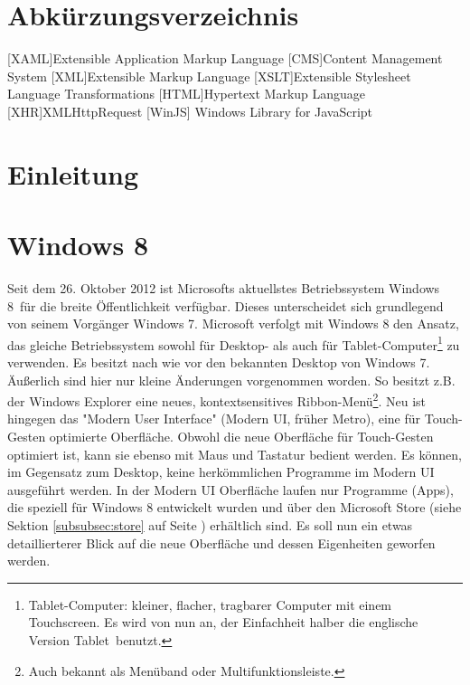 \documentclass[12pt,a4paper,bibtotoc]{scrartcl}
\author{Malte Modrow}
\begin{document}
\thispagestyle{plain}
\tableofcontents
\thispagestyle{plain}

\newpage
\listoffigures
\vspace{2cm}
\listoftables

\newpage
\lstlistoflistings
\vspace{2cm}
\section*{Abkürzungsverzeichnis}
\label{sec:abkürzungen}
\begin{acronym}[SEPSEP]
	[XAML]{Extensible Application Markup Language}
	 [CMS]{Content Management System}
	 [XML]{Extensible Markup Language}
	[XSLT]{Extensible Stylesheet Language Transformations}
	[HTML]{Hypertext Markup Language}
	[XHR]{XMLHttpRequest}
	[WinJS] {Windows Library for JavaScript}
\end{acronym}

\newpage
\section{Einleitung}
\label{sec:einleitung}
\newpage
\section{Windows 8}
\label{sec:windows8}
Seit dem 26. Oktober 2012 ist Microsofts aktuellstes Betriebssystem \glqq Windows 8\grqq\ für die breite Öffentlichkeit verfügbar. Dieses unterscheidet sich grundlegend von seinem Vorgänger \glqq Windows 7\grqq. Microsoft verfolgt mit Windows 8 den Ansatz, das gleiche Betriebssystem sowohl für Desktop- als auch für Tablet-Computer\footnote{Tablet-Computer: kleiner, flacher, tragbarer Computer mit einem Touchscreen. Es wird von nun an, der Einfachheit halber die englische Version \glqq Tablet\grqq\ benutzt.} zu verwenden. Es besitzt nach wie vor den bekannten Desktop von Windows 7. Äußerlich sind hier nur kleine Änderungen vorgenommen worden. So besitzt z.B. der Windows Explorer eine neues, kontextsensitives Ribbon-Menü\footnote{Auch bekannt als Menüband oder Multifunktionsleiste.}. Neu ist hingegen das "Modern User Interface" (Modern UI, früher Metro), eine für Touch-Gesten optimierte Oberfläche. Obwohl die neue Oberfläche für Touch-Gesten optimiert ist, kann sie ebenso mit Maus und Tastatur bedient werden. Es können, im Gegensatz zum Desktop, keine herkömmlichen Programme im Modern UI ausgeführt werden. In der Modern UI Oberfläche laufen nur Programme (Apps), die speziell für Windows 8 entwickelt wurden und über den Microsoft Store (siehe Sektion \ref{subsubsec:store} auf Seite \pageref{subsubsec:store}) erhältlich sind. Es soll nun ein etwas detaillierterer Blick auf die neue Oberfläche und dessen Eigenheiten geworfen werden.
\end{document}
